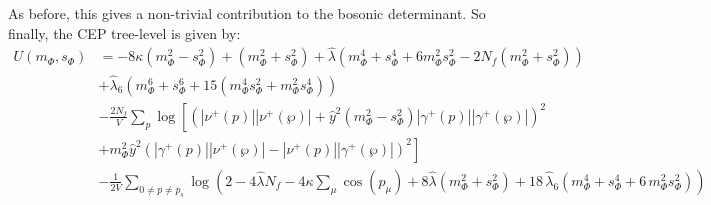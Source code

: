 {As before, this gives a non-trivial contribution to the bosonic determinant. So finally, the CEP tree-level is given by:
\begin{align}\label{eq:improved_zeroOrderPot_withPhi6}
 U(m_{\Phi}, s_{\Phi}) &= -8 \kappa \left( m_{\Phi}^2 - s_{\Phi}^2 \right)   +   \left( m_{\Phi}^2 + s_{\Phi}^2 \right)
                         + \hat\lambda \left( m_{\Phi}^4 + s_{\Phi}^4 + 6 m_{\Phi}^2 s_{\Phi}^2 - 2 N_f \left(m_{\Phi}^2 + s_{\Phi}^2 \right) \right) 
         \nonumber \\
                        & + \hat\lambda_6 \left( m_{\Phi}^6 + s_{\Phi}^6 + 15 \left( m_{\Phi}^4 s_{\Phi}^2 + m_{\Phi}^2 s_{\Phi}^4 \right)   \right)
         \nonumber \\
                        & -\frac{2N_f}{V} \sum\limits_p \log
                                    \left[ \left( |\nu^+(p)| |\nu^+(\wp)|   +
                                    \hat y ^2 \left( m_{\Phi}^2 - s_{\Phi}^2 \right) |\gamma^+(p)| |\gamma^+(\wp)|\right)^2 
         \nonumber \right. \\
                        & \left. +  m_{\Phi}^2 \hat y^2 \left( |\gamma^+(p)| |\nu^+(\wp)|   -   |\nu^+(p)| |\gamma^+(\wp)| \right)^2\right]
         \nonumber \\
                        & - \frac{1}{2V}\sum\limits_{0 \neq p \neq p_s} 
          \log\left( 2 - 4 \hat\lambda N_f - 4 \kappa \sum_{\mu} \cos(p_{\mu}) + 8 \hat\lambda \left( m_{\Phi}^2 + s_{\Phi}^2  \right) 
                     +  18\, \hat\lambda_6\left( m_{\Phi}^4 + s_{\Phi}^4 + 6\, m_{\Phi}^2 s_{\Phi}^2 \right) \right)
\end{align}

}
